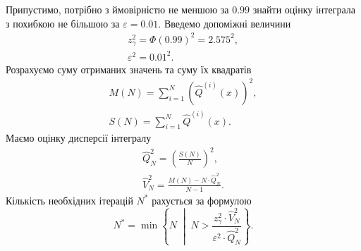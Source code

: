 Припустимо,
потрібно з ймовірністю не меншою за $0.99$
знайти оцінку інтеграла з похибкою не більшою за $\varepsilon = 0.01$.
Введемо допоміжні величини
\begin{equation*}
  \begin{split}
    z^2_{\gamma} = \Phi\left( 0.99 \right)^2 = 2.575^2, \\
    \varepsilon^2 = 0.01^2.
  \end{split}
\end{equation*}
Розрахуємо суму отриманих значень та суму їх квадратів
\begin{equation*}
  \begin{split}
    M\left( N \right) = \sum_{i=1}^{N} \left(
        \hat{Q}^{\left( i \right)}\left( x \right)
      \right)^2, \\
    S\left( N \right) = \sum_{i=1}^{N}
        \hat{Q}^{\left( i \right)}\left( x \right).
  \end{split}
\end{equation*}
Маємо оцінку дисперсії інтегралу
\begin{equation*}
  \begin{split}
    \hat{Q}^2_N = \left( \frac{S\left( N \right)}{N} \right)^2, \\
    \hat{V}^2_N = \frac{M\left( N \right) - N \cdot \hat{Q}^2_N}{N-1}.
  \end{split}
\end{equation*}
Кількість необхідних ітерацій $N^*$ рахується за формулою
\begin{equation*}
  N^* = \min{\left\{ N \;\middle|\;
    N > \frac{z^2_{\gamma} \cdot \hat{V}^2_N}
    {\varepsilon^2 \cdot \hat{Q}^2_N} \right\}}.
\end{equation*}
